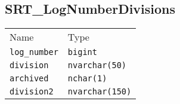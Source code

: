 \subsection{SRT\_LogNumberDivisions}
\begin{table}[h]
\centering
\begin{tabular}{ll}
Name    & Type  \\
\verb|log_number|   &   \verb|bigint|           \\
\verb|division|     &   \verb|nvarchar(50)|     \\
\verb|archived|     &   \verb|nchar(1)|         \\
\verb|division2|    &   \verb|nvarchar(150)|
\end{tabular}
\end{table}
